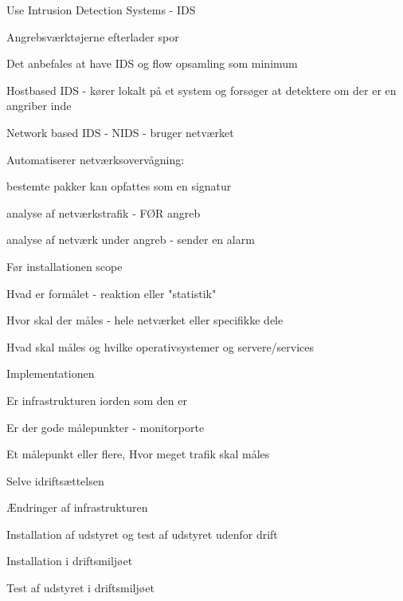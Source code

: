 \documentclass[Screen16to9,17pt]{foils}
\begin{document}

\begin{list1}
\item Use Intrusion Detection Systems - IDS
\item Angrebsværktøjerne efterlader spor
\item Det anbefales at have IDS og flow opsamling som minimum
\item Hostbased IDS - kører lokalt på et system og forsøger at
  detektere om der er en angriber inde
\item Network based IDS - NIDS - bruger netværket
\item Automatiserer netværksovervågning:
  \begin{list2}
  \item bestemte pakker kan opfattes som en signatur
\item analyse af netværkstrafik - FØR angreb
\item analyse af netværk under angreb - sender en alarm
  \end{list2}
\end{list1}



\begin{list1}
\item Før installationen scope
\begin{list2}
\item Hvad er formålet - reaktion eller "statistik"
\item Hvor skal der måles - hele netværket eller specifikke dele
\item Hvad skal måles og hvilke operativsystemer og servere/services
\end{list2}
\item Implementationen
\begin{list2}
\item Er infrastrukturen iorden som den er
\item Er der gode målepunkter - monitorporte
\item Et målepunkt eller flere, Hvor meget trafik skal måles
\end{list2}
\item Selve idriftsættelsen
\begin{list2}
\item Ændringer af infrastrukturen
\item Installation af udstyret og test af udstyret udenfor drift
\item Installation i driftsmiljøet
\item Test af udstyret i driftsmiljøet
\end{list2}
\end{list1}
\end{document}
